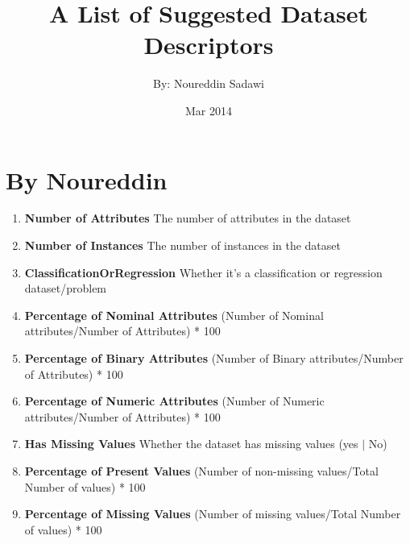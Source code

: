 \documentclass[a4paper,12pt, english]{article}
\begin{document}
\title{A List of Suggested Dataset Descriptors}
\date{Mar 2014}
\author{By: Noureddin Sadawi}
\maketitle

\large
\section{By Noureddin}
\begin{enumerate}
\item \textbf{Number of Attributes} The number of attributes in the dataset
\item \textbf{Number of Instances}  The number of instances in the dataset
\item \textbf{ClassificationOrRegression}  Whether it's a classification or regression dataset/problem
\item \textbf{Percentage of Nominal Attributes} (Number of Nominal attributes/Number of Attributes) * 100
\item \textbf{Percentage of Binary Attributes} (Number of Binary attributes/Number of Attributes) * 100
\item \textbf{Percentage of Numeric Attributes} (Number of Numeric attributes/Number of Attributes) * 100      


\item \textbf{Has Missing Values} Whether the dataset has missing values (yes $|$ No)
\item \textbf{Percentage of Present Values} (Number of non-missing values/Total Number of values) * 100 
\item \textbf{Percentage of Missing Values} (Number of missing values/Total Number of values) * 100 
\end{enumerate}    
\end{document}
